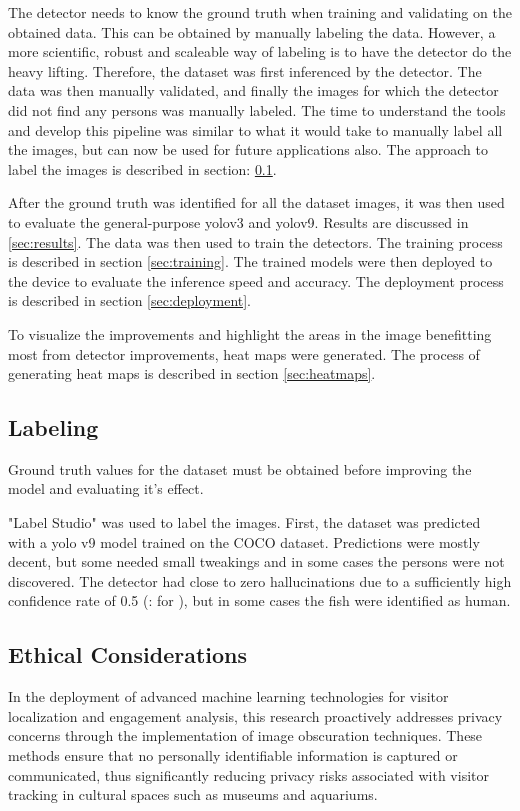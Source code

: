 The detector needs to know the ground truth when training and validating on the obtained data. This can be obtained by manually labeling the data. However, a more scientific, robust and scaleable way of labeling is to have the detector do the heavy lifting. Therefore, the dataset was first inferenced by the detector. The data was then manually validated, and finally the images for which the detector did not find any persons was manually labeled. The time to understand the tools and develop this pipeline was similar to what it would take to manually label all the images, but can now be used for future applications also. The approach to label the images is described in section: \ref{sec:labeling}.

After the ground truth was identified for all the dataset images, it was then used to evaluate the general-purpose yolov3 and yolov9. Results are discussed in \ref{sec:results}. The data was then used to train the detectors. The training process is described in section \ref{sec:training}. The trained models were then deployed to the device to evaluate the inference speed and accuracy. The deployment process is described in section \ref{sec:deployment}.

To visualize the improvements and highlight the areas in the image benefitting most from detector improvements, heat maps were generated. The process of generating heat maps is described in section \ref{sec:heatmaps}.

\subsection{Labeling}
\label{sec:labeling}
Ground truth values for the dataset must be obtained before improving the model and evaluating it's effect. 

"Label Studio" was used to label the images. First, the dataset was predicted with a yolo v9 model trained on the COCO dataset. Predictions were mostly decent, but some needed small tweakings and in some cases the persons were not discovered. The detector had close to zero hallucinations due to a sufficiently high confidence rate of 0.5 (: for ), but in some cases the fish were identified as human.

\subsection{Ethical Considerations}
In the deployment of advanced machine learning technologies for visitor localization and engagement analysis, this research proactively addresses privacy concerns through the implementation of image obscuration techniques. These methods ensure that no personally identifiable information is captured or communicated, thus significantly reducing privacy risks associated with visitor tracking in cultural spaces such as museums and aquariums.

